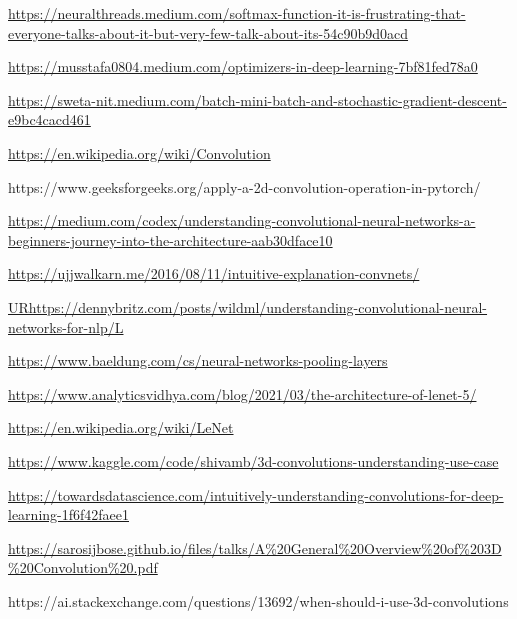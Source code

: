\begin{thebibliography}{99}
\url{https://neuralthreads.medium.com/softmax-function-it-is-frustrating-that-everyone-talks-about-it-but-very-few-talk-about-its-54c90b9d0acd}

\url{https://musstafa0804.medium.com/optimizers-in-deep-learning-7bf81fed78a0}

\url{https://sweta-nit.medium.com/batch-mini-batch-and-stochastic-gradient-descent-e9bc4cacd461}


\url{https://en.wikipedia.org/wiki/Convolution}


https://www.geeksforgeeks.org/apply-a-2d-convolution-operation-in-pytorch/

\url{https://medium.com/codex/understanding-convolutional-neural-networks-a-beginners-journey-into-the-architecture-aab30dface10}

\url{https://ujjwalkarn.me/2016/08/11/intuitive-explanation-convnets/}

\url{URhttps://dennybritz.com/posts/wildml/understanding-convolutional-neural-networks-for-nlp/L}

\url{https://www.baeldung.com/cs/neural-networks-pooling-layers}

\url{https://www.analyticsvidhya.com/blog/2021/03/the-architecture-of-lenet-5/}

\url{https://en.wikipedia.org/wiki/LeNet}

\url{https://www.kaggle.com/code/shivamb/3d-convolutions-understanding-use-case}

\url{https://towardsdatascience.com/intuitively-understanding-convolutions-for-deep-learning-1f6f42faee1}

\url{https://sarosijbose.github.io/files/talks/A%20General%20Overview%20of%203D%20Convolution%20.pdf}

https://ai.stackexchange.com/questions/13692/when-should-i-use-3d-convolutions


\end{thebibliography}
